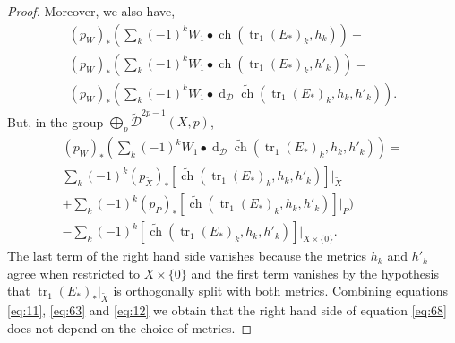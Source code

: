 \documentclass[10pt,twoside]{article}
\numberwithin{equation}{section}
\theoremstyle{plain}
\theoremstyle{definition}
\DeclareMathOperator{\tr}{tr}
\DeclareMathOperator{\dd}{d}
\DeclareMathOperator{\ch}{ch}
\begin{document}
\begin{proof}
  Moreover, we also have,
  \begin{multline} \label{eq:63}
    (p_{W})_{\ast}
    \left(\sum_{k}(-1)^{k}W_{1} \bullet \ch(\tr_{1}(E_{\ast})_{k},h_{k}) 
    \right)- \\(p_{W})_{\ast}
    \left(\sum_{k}(-1)^{k}W_{1} \bullet \ch(\tr_{1}(E_{\ast})_{k},h'_{k})
    \right)=\\
    (p_{W})_{\ast}
    \left(\sum_{k}(-1)^{k}W_{1} \bullet \dd_{\mathcal{D}}\widetilde
      {\ch}(\tr_{1}(E_{\ast})_{k},h_{k},h'_{k})  
    \right).
  \end{multline}
  But, in the group $\bigoplus_{p}\widetilde{\mathcal{D}}^{2p-1}(X,p)$,
  \begin{multline}\label{eq:12}
    (p_{W})_{\ast}
    \left(\sum_{k}(-1)^{k}W_{1} \bullet \dd_{\mathcal{D}}\widetilde
      {\ch}(\tr_{1}(E_{\ast})_{k},h_{k},h'_{k})
    \right)=\\\sum_{k}(-1)^{k}(p_{\widetilde X})_{\ast}[\widetilde
    {\ch}(\tr_{1}(E_{\ast})_{k},h_{k},h'_{k})]|_{\widetilde X}\\
    +
    \sum_{k}(-1)^{k}(p_{P})_{\ast}[\widetilde
    {\ch}(\tr_{1}(E_{\ast})_{k},h_{k},h'_{k})]|_{P})\\
    -\sum_{k}(-1)^{k}[\widetilde
    {\ch}(\tr_{1}(E_{\ast})_{k},h_{k},h'_{k})]|_{X\times
      \{0\}}.
  \end{multline}
  The last term of the right hand side vanishes because the metrics $h_{k}$
  and $h'_{k}$ agree when restricted to $X\times \{0\}$ and the first
  term vanishes by the hypothesis that $\tr_{1}(E_{\ast})_{\ast}|_{\widetilde
    X}$ is orthogonally split with both metrics. Combining equations
  \eqref{eq:11}, \eqref{eq:63} and \eqref{eq:12} we obtain that the right hand
  side of equation \eqref{eq:68} does not depend on the 
  choice of metrics.
  

\end{proof}
\end{document}
